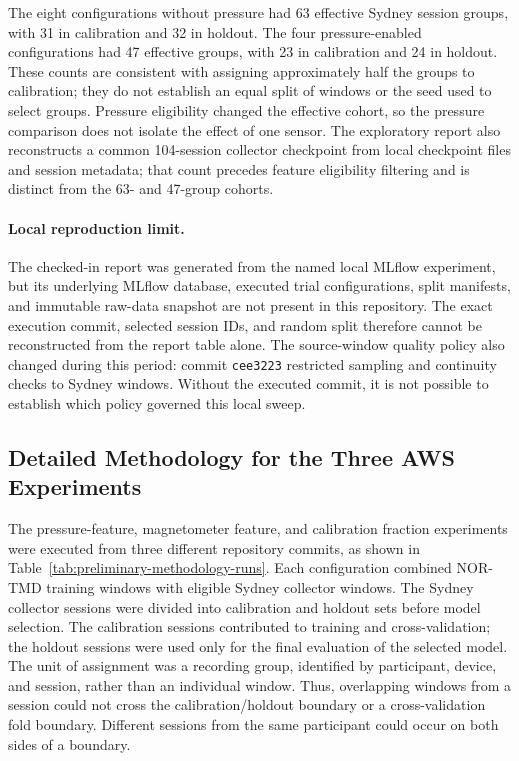 The eight configurations without pressure had 63 effective Sydney session
groups, with 31 in calibration and 32 in holdout. The four pressure-enabled
configurations had 47 effective groups, with 23 in calibration and 24 in
holdout. These counts are consistent with assigning approximately half the
groups to calibration; they do not establish an equal split of windows or the
seed used to select groups. Pressure eligibility changed the effective cohort,
so the pressure comparison does not isolate the effect of one sensor. The
exploratory report also reconstructs a common 104-session collector checkpoint
from local checkpoint files and session metadata; that count precedes feature
eligibility filtering and is distinct from the 63- and 47-group cohorts.

\paragraph{Local reproduction limit.}
The checked-in report was generated from the named local MLflow experiment,
but its underlying MLflow database, executed trial configurations, split
manifests, and immutable raw-data snapshot are not present in this repository.
The exact execution commit, selected session IDs, and random split therefore
cannot be reconstructed from the report table alone. The source-window quality
policy also changed during this period: commit \texttt{cee3223} restricted
sampling and continuity checks to Sydney windows. Without the executed commit,
it is not possible to establish which policy governed this local sweep.

\subsection{Detailed Methodology for the Three AWS Experiments}
\label{sec:preliminary-aws-methodology}

The pressure-feature, magnetometer feature, and calibration fraction experiments
were executed from three different repository commits, as shown in
Table~\ref{tab:preliminary-methodology-runs}. Each configuration combined
NOR-TMD training windows with eligible Sydney collector windows. The Sydney
collector sessions were divided into calibration and holdout sets before model
selection. The calibration sessions contributed to training and cross-validation;
the holdout sessions were used only for the final evaluation of the selected
model. The unit of assignment was a recording group, identified by participant,
device, and session, rather than an individual window. Thus, overlapping windows
from a session could not cross the calibration/holdout boundary or a
cross-validation fold boundary. Different sessions from the same participant
could occur on both sides of a boundary.

